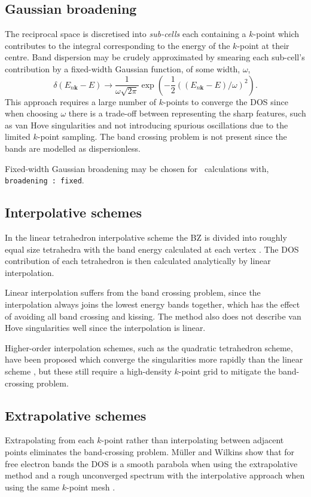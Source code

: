 \documentclass[a4paper,11pt,twoside]{book}
\newcommand{\kbf}{\mathbf{k}}
\begin{document}
\subsection{Gaussian broadening}
%
The reciprocal space is discretised into \emph{sub-cells} each containing a $k$-point which contributes to the integral corresponding to the energy of the $k$-point at their centre.
%
Band dispersion may be crudely approximated by smearing each sub-cell's contribution by a fixed-width Gaussian function, of some width, $\omega$,
\begin{equation}
\delta (E_{n\kbf}-E) \rightarrow \frac{1}{\omega\sqrt{2\pi}}\exp \left (-\frac{1}{2}((E_{n\kbf}-E)/\omega)^2 \right ).
\end{equation}
This approach requires a large number of $k$-points to converge the DOS since when choosing $\omega$ there is a trade-off between representing the sharp features, such as van Hove singularities\cite{vanHove:PR:1953}  and not introducing spurious oscillations due to the limited $k$-point sampling.
%
The band crossing problem is not present since the bands are modelled as dispersionless.

Fixed-width Gaussian broadening may be chosen  for \optados\ calculations with, \texttt{broadening : fixed}.


\subsection{Interpolative schemes}
In the linear tetrahedron interpolative scheme the BZ is divided into
roughly equal size tetrahedra with the band energy calculated at each
vertex \cite{lehmann:PSS:1972}.
%
The DOS contribution of each tetrahedron is then calculated analytically by linear interpolation.

Linear interpolation suffers from the band crossing problem, since the interpolation always joins the lowest energy bands together, which has the effect of avoiding all band crossing and kissing.
%
The method also does not describe van Hove singularities well since the interpolation is linear.

Higher-order interpolation schemes, such as the quadratic tetrahedron scheme,  have been proposed which converge the singularities more rapidly than the linear scheme  \cite{boon:JPC:1986,methfessel:JPC:1983,methfessel:JPC:1987}, but these still require a high-density $k$-point grid to mitigate the band-crossing problem.


\subsection{Extrapolative schemes}
Extrapolating from each $k$-point rather than interpolating between adjacent points eliminates the band-crossing problem.
%
M\"uller and Wilkins show that for free electron bands the DOS is a smooth parabola when using the extrapolative method and a rough unconverged spectrum with the interpolative approach when using the same $k$-point mesh \cite{muller:PRB:1984}.
\end{document}
